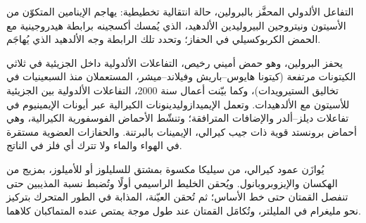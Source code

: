 \begin{omfigure}

{\small التفاعل الألدولي المحفَّز بالبرولين، حالة انتقالية تخطيطية: يهاجم
الإينامين المتكوّن من الأسيتون ونيتروجين البيروليدين الألدهيد،
الذي يُمسك أكسجينه برابطة هيدروجينية مع الحمض الكربوكسيلي في الحفاز؛
وتحدد تلك الرابطة وجه الألدهيد الذي يُهاجَم.}
\end{omfigure}

يحفز البرولين، وهو حمض أميني رخيص، التفاعلات الألدولية داخل الجزيئية في
ثلاثي الكيتونات  مرتفعة (كيتونا هايوس--باريش وفيلاند--ميشر، المستعملان
منذ السبعينيات في تخاليق الستيرويدات)، وكما بيّنت أعمال سنة 2000، التفاعلات الألدولية
بين الجزيئية للأسيتون مع الألدهيدات. وتعمل الإيميدازوليدينونات الكيرالية عبر
أيونات الإيمينيوم في تفاعلات ديلز--ألدر والإضافات المترافقة؛ وتنشّط الأحماض
الفوسفورية الكيرالية، وهي أحماض برونستد قوية ذات جيب كيرالي، الإيمينات
بالبرتنة. والحفازات العضوية مستقرة في الهواء والماء ولا تترك أي فلز
في الناتج.

\begin{inthelab}
يُوازَن عمود كيرالي، من سيليكا مكسوة بمشتق للسليلوز أو للأميلوز،
بمزيج من الهكسان والإيزوبروبانول. ويُحقن الخليط الراسيمي أولًا
وتُضبط نسبة المذيبين حتى تنفصل القمتان حتى خط الأساس؛ ثم
تُحقن العيّنة، المذابة في الطور المتحرك بتركيز نحو مليغرام في المليلتر،
وتُكامَل القمتان عند طول موجة يمتص عنده المتماكبان كلاهما.
\end{inthelab}

